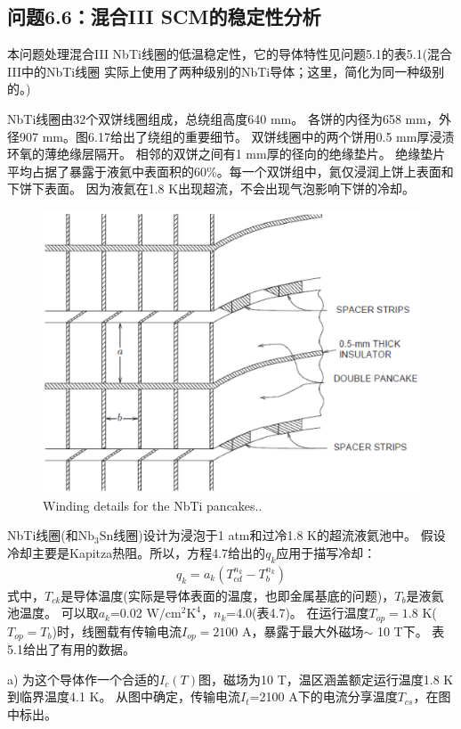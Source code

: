 \subsection{问题6.6：混合III SCM的稳定性分析}
本问题处理混合III NbTi线圈的低温稳定性，它的导体特性见问题5.1的表5.1(混合III中的NbTi线圈
实际上使用了两种级别的NbTi导体；这里，简化为同一种级别的。)

NbTi线圈由32个双饼线圈组成，总绕组高度640 mm。
各饼的内径为658 mm，外径907 mm。图6.17给出了绕组的重要细节。
双饼线圈中的两个饼用0.5 mm厚浸渍环氧的薄绝缘层隔开。
相邻的双饼之间有1 mm厚的径向的绝缘垫片。
绝缘垫片平均占据了暴露于液氦中表面积的60\%。每一个双饼组中，氦仅浸润上饼上表面和下饼下表面。
因为液氦在1.8 K出现超流，不会出现气泡影响下饼的冷却。

\begin{figure}[htbp]
	\centering
	\includegraphics[scale=0.7]{chpt6/figs/fig6.17.eps}
	\caption{Winding details for the NbTi pancakes..}
\end{figure}
NbTi线圈(和$\mathrm{Nb_3 Sn}$线圈)设计为浸泡于1 atm和过冷1.8 K的超流液氦池中。
假设冷却主要是Kapitza热阻。所以，方程4.7给出的$q_k$应用于描写冷却：
\begin{align*}%
q_k=a_k(T^{n_k}_{cd}-T^{n_k}_b) \tag{4.7}
\end{align*}
式中，$T_{ck}$是导体温度(实际是导体表面的温度，也即金属基底的问题)，$T_b$是液氦池温度。
可以取$a_k$=0.02 $\mathrm{W/cm^2 K^4}$，$n_k$=4.0(表4.7)。
在运行温度$T_{op}=1.8$ K($T_{op}=T_b$)时，线圈载有传输电流$I_{op}=2100$ A，暴露于最大外磁场$\sim$ 10 T下。
表5.1给出了有用的数据。

a) 为这个导体作一个合适的$I_c(T)$图，磁场为10 T，温区涵盖额定运行温度1.8 K到临界温度4.1 K。
从图中确定，传输电流$I_t$=2100 A下的电流分享温度$T_{cs}$，在图中标出。


